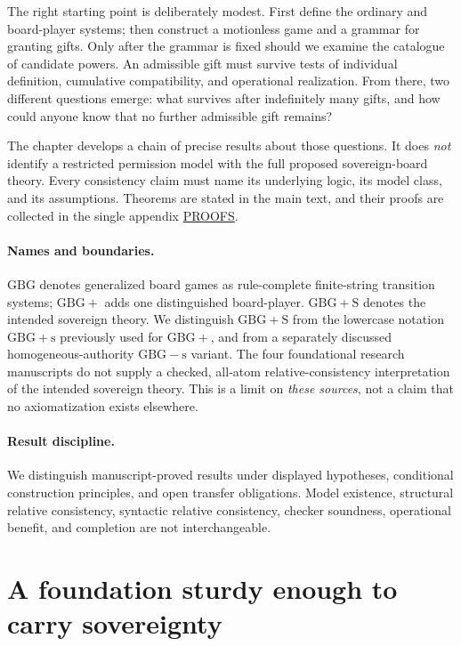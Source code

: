 \documentclass[11pt,letterpaper]{article}
\theoremstyle{definition}\newtheorem{definition}[theorem]{Definition}\newtheorem{example}[theorem]{Example}
\theoremstyle{remark}\newtheorem{remark}[theorem]{Remark}
\begin{document}
The right starting point is deliberately modest. First define the ordinary
and board-player systems; then construct a motionless game and a grammar
for granting gifts. Only after the grammar is fixed should we examine the
catalogue of candidate powers. An admissible gift must survive tests of
individual definition, cumulative compatibility, and operational realization.
From there, two different questions emerge: what survives after indefinitely
many gifts, and how could anyone know that no further admissible gift remains?

The chapter develops a chain of precise results about those questions. It
does \emph{not} identify a restricted permission model with the full proposed
sovereign-board theory. Every consistency claim must name its underlying
logic, its model class, and its assumptions. Theorems are stated in the main
text, and their proofs are collected in the single appendix \hyperref[sec:all-proofs]{PROOFS}.

\paragraph{Names and boundaries.}
$\mathrm{GBG}$ denotes generalized board games as rule-complete finite-string
transition systems; $\mathrm{GBG+}$ adds one distinguished board-player.
$\mathrm{GBG+S}$ denotes the intended sovereign theory. We distinguish
$\mathrm{GBG+S}$ from the lowercase notation $\mathrm{GBG+s}$ previously used
for $\mathrm{GBG+}$, and from a separately discussed homogeneous-authority
$\mathrm{GBG-s}$ variant. The four foundational research manuscripts do not
supply a checked, all-atom relative-consistency interpretation of the intended
sovereign theory. This is a limit on \emph{these sources}, not a claim that no
axiomatization exists elsewhere.

\paragraph{Result discipline.}
We distinguish manuscript-proved results under displayed hypotheses,
conditional construction principles, and open transfer obligations.
Model existence, structural relative consistency, syntactic relative
consistency, checker soundness, operational benefit, and completion are
not interchangeable.

\section{A foundation sturdy enough to carry sovereignty}\label{sec:foundation}
\end{document}
